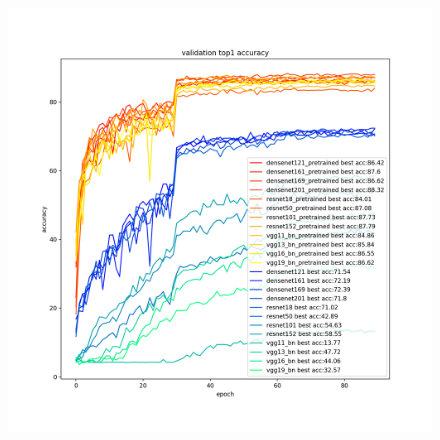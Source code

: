 

\begin{figure}[ht]
  \begin{minipage}[t]{0.5\linewidth}
    \centering
    \includegraphics[width=1.1\textwidth]{figs/val_acc1.png}
    \label{fig:val_acc1}
  \end{minipage}\hfill
  \begin{minipage}[t]{0.5\linewidth}
    \centering

\end{minipage}
\end{figure}
